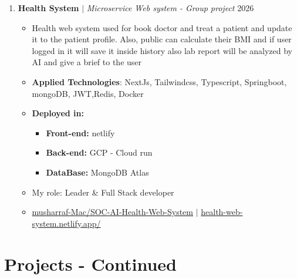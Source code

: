 \documentclass[10pt,a4paper]{article}
\newcommand{\project}[3]{%
  \textbf{#1} $|$ \textit{#2} \hfill #3}
\begin{document}
\begin{enumerate}
  \item \project{Health System}{Microservice Web system - Group project}{2026}
   \begin{itemize}
    \item Health web system used for book doctor and treat a patient and update it to the patient profile. Also, public can calculate their BMI and if user logged in it will save it inside history also lab report will be analyzed by AI and give a brief to the user
    \item \textbf{Applied Technologies}: NextJs, Tailwindcss, Typescript, Springboot, mongoDB, JWT,Redis, Docker
    \item \textbf{Deployed in:}
      \begin{itemize}
        \item \textbf{Front-end:} netlify
        \item \textbf{Back-end:} GCP - Cloud run
        \item \textbf{DataBase:} MongoDB Atlas
      \end{itemize}
    \item My role: Leader \& Full Stack developer
    \item \faGithub \href{https://github.com/musharraf-Mac/SOC-AI-Health-Web-System}{ musharraf-Mac/SOC-AI-Health-Web-System} \hspace{0.15cm} $|$ \hspace{0.15cm} \faLink \href{https://health-web-system.netlify.app/}{ health-web-system.netlify.app/}
   \end{itemize}

\end{enumerate}
\vspace{8pt}
\section{Projects - Continued}
\end{document}
